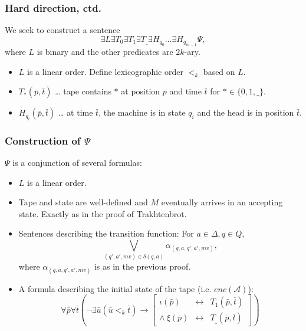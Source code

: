 \documentclass{beamer}
\newcommand{\A}{\mathcal{A}}
\begin{document}
\begin{frame}
	\frametitle{Hard direction, ctd.}
	We seek to construct a sentence
	\begin{equation*}
	∃L ∃T_0 ∃T_1 ∃T_{\_} ∃H_{q_0} … ∃H_{q_{m-1}} Ψ,
	\end{equation*}
	where $L$ is binary and the other predicates are $2k$-ary.
	
	\medskip
	
	\begin{itemize}
	\item<2-> $L$ is a linear order. Define lexicographic order $<_k$ based on $L$.
	\item<3-> $T_{*}(\bar{p}, \bar{t})$ … tape contains $*$ at position $\bar{p}$ and time $\bar{t}$ for $* ∈ \{0, 1, \_\}$.
	\item<4-> $H_{q_i}(\bar{p},\bar{t})$ … at time $\bar{t}$, the machine is in state $q_{i}$ and the head is in position $\bar{t}$.
	\end{itemize}
\end{frame}

\begin{frame}
	\frametitle{Construction of $Ψ$}
	$Ψ$ is a conjunction of several formulas:
	\begin{itemize}
		\item<2-> $L$ is a linear order.
		\item<3-> Tape and state are well-defined and $M$ eventually arrives in an accepting state. Exactly as in the proof of Trakhtenbrot.
		\item<4-> Sentences describing the transition function: For $a ∈ Δ, q ∈ Q$,
		\begin{equation*}
		\bigvee_{(q',a',mv) ∈ δ(q,a)} α_{(q,a,q',a',mv)},
		\end{equation*}
		where $α_{(q,a,q',a',mv)}$ is as in the previous proof.
		\item<5-> A formula describing the initial state of the tape (i.e. $enc(\A)$):
		\begin{equation*}
		∀\bar{p}∀\bar{t}\left(¬∃\bar{u} (\bar{u} <_k \bar{t}) → \left[
		\begin{array}{rcl}
		ι(\bar{p})&\leftrightarrow&T_1(\bar{p},\bar{t})\\
		∧\ ξ(\bar{p})&\leftrightarrow&T_{\_}(\bar{p},\bar{t})
		\end{array}		
		\right]\right)
		\end{equation*}
	\end{itemize}
\end{frame}
\end{document}

